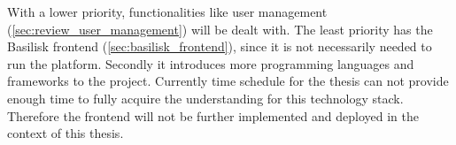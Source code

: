 With a lower priority, functionalities like user management (\ref{sec:review_user_management}) will be dealt with.
The least priority has the Basilisk frontend (\ref{sec:basilisk_frontend}), since it is not necessarily needed to run the platform.
Secondly it introduces more programming languages and frameworks to the project.
Currently time schedule for the thesis can not provide enough time to fully acquire the understanding for this technology stack.
Therefore the frontend will not be further implemented and deployed in the context of this thesis.














	